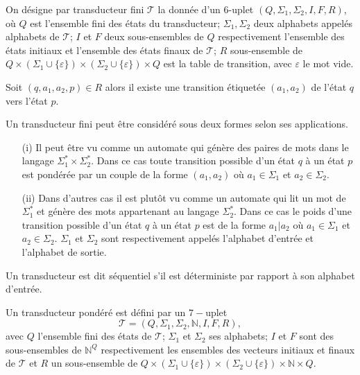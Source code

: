 \begin{Def}\label{trans1}
On désigne par transducteur fini $\mathcal{T}$ la donnée d'un $6$-uplet  $(Q, \Sigma_{1}, \Sigma_{2}, I, F, R)$, où 
 $Q$ est l’ensemble fini des états du transducteur;
 $\Sigma_{1}, \Sigma_{2}$ deux alphabets appelés alphabets de $\mathcal{T}$; $I$ et $F$ deux sous-ensembles de $Q$ respectivement l'ensemble des états initiaux et l'ensemble des états finaux de $\mathcal{T}$; $R$  sous-ensemble de  $Q \times (\Sigma_{1} \cup \{\varepsilon\}) \times(\Sigma_{2} \cup \{\varepsilon\}) \times  Q$ est la table de transition, avec $\varepsilon$  le mot vide.
 
Soit $(q,a_{1},a_{2},p)\in R$ alors il existe une transition étiquetée $(a_{1},a_{2})$ de l'état $q$ vers l'état $p$.
\end{Def}
Un transducteur fini peut être considéré sous deux formes selon ses applications.
\begin{itemize}
\item[(i)] Il peut être vu comme un automate qui génère  des paires de mots dans le  langage $\Sigma_{1}^{*}\times \Sigma_{2}^{*}$.  Dans ce cas toute transition possible d'un état $q$ à un état $p$ est pondérée par un couple de la forme $(a_{1},a_{2})$ où $a_{1}\in \Sigma_{1}$ et $a_{2}\in \Sigma_{2}$.

\item[(ii)] Dans d'autres cas il est plutôt vu comme un automate qui lit un mot de  $\Sigma_{1}^{*}$ et génère des mots appartenant au langage  $\Sigma_{2}^{*}$. Dans ce cas le poids d'une transition possible d'un état $q$ à un état $p$ est de la forme $a_{1}|a_{2}$ où $a_{1}\in \Sigma_{1}$ et $a_{2}\in \Sigma_{2}$.
$\Sigma_{1}$ et $\Sigma_{2}$ sont respectivement appelés l'alphabet d'entrée et l'alphabet de sortie.
\end{itemize}
\begin{Def}
Un transducteur est dit séquentiel s’il est déterministe par rapport à son alphabet d'entrée.
\end{Def}
\begin{Def}\label{trans3}
Un transducteur pondéré est défini par un $7-$uplet
 $$\mathcal{T}=(Q,\Sigma_{1},\Sigma_{2},\mathbb{N},I,F,R),$$ avec $Q$ l'ensemble fini des états de $\mathcal{T}$; $\Sigma_{1}$ et $\Sigma_{2}$ ses alphabets; $I$ et $F$ sont des sous-ensembles de $\mathbb{N}^{Q}$ respectivement les ensembles des vecteurs initiaux et finaux de $\mathcal{T}$ et $R$ un sous-ensemble de $Q \times (\Sigma_{1} \cup \{\varepsilon\}) \times(\Sigma_{2} \cup \{\varepsilon\})\times \mathbb{N} \times  Q$.
\end{Def}
